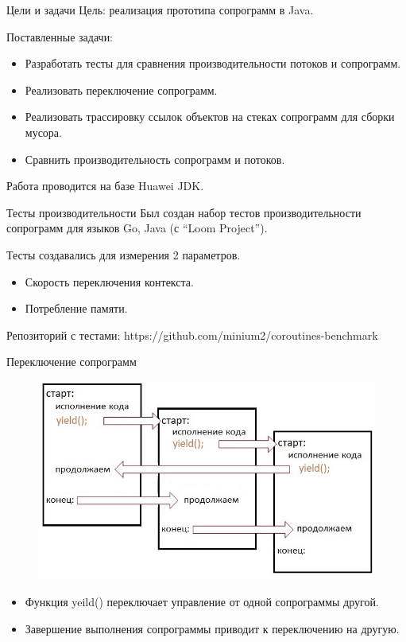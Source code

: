 \begin{frame}{Цели и задачи}
	Цель: реализация прототипа сопрограмм в Java.
	\par
	Поставленные задачи:
	\begin{itemize}
		\item Разработать тесты для сравнения производительности потоков и сопрограмм.
		\item Реализовать переключение сопрограмм.
		\item Реализовать трассировку ссылок объектов на стеках сопрограмм для сборки мусора.
		\item Сравнить производительность сопрограмм и потоков. 
	\end{itemize}
	Работа проводится на базе Huawei JDK.
\end{frame} 

\begin{frame}{Тесты производительности}
	Был создан набор тестов производительности сопрограмм для языков Go, Java (с “Loom Project”).
	
	Тесты создавались для измерения 2 параметров.
	\begin{itemize}
		\item Скорость переключения контекста.
		\item Потребление памяти.
	\end{itemize}
	Репозиторий с тестами: https://github.com/minium2/coroutines-benchmark
\end{frame}

\begin{frame}{Переключение сопрограмм}
	\begin{figure}
		\includegraphics[scale=0.5]{images/scheme.jpg}
	\end{figure}
	\par
	\begin{itemize}
		\item Функция yeild() переключает управление от одной сопрограммы другой.
		\item Завершение выполнения сопрограммы приводит к переключению на другую.
	\end{itemize}
\end{frame}

